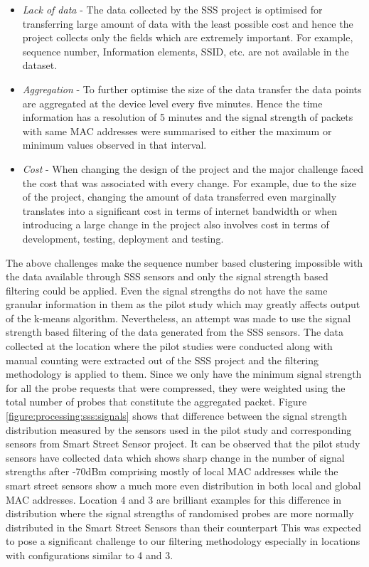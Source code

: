 \begin{itemize}
  \item \textit{Lack of data} - The data collected by the SSS project is optimised for transferring large amount of data with the least possible cost and hence the project collects only the fields which are extremely important. For example, sequence number, Information elements, SSID, etc. are not available in the dataset.
  \item \textit{Aggregation} - To further optimise the size of the data transfer the data points are aggregated at the device level every five minutes. Hence the time information has a resolution of 5 minutes and the signal strength of packets with same MAC addresses were summarised to either the maximum or minimum values observed in that interval.
  \item \textit{Cost} - When changing the design of the project and the major challenge faced the cost that was associated with every change. For example, due to the size of the project, changing the amount of data transferred even marginally translates into a significant cost in terms of internet bandwidth or when introducing a large change in the project also involves cost in terms of development, testing, deployment and testing.
\end{itemize}

The above challenges make the sequence number based clustering impossible with the data available through SSS sensors and only the signal strength based filtering could be applied. 
Even the signal strengths do not have the same granular information in them as the pilot study which may greatly affects output of the k-means algorithm.
Nevertheless, an attempt was made to use the signal strength based filtering of the data generated from the SSS sensors.
The data collected at the location where the pilot studies were conducted along with manual counting were extracted out of the SSS project and the filtering methodology is applied to them.
Since we only have the minimum signal strength for all the probe requests that were compressed, they were weighted using the total number of probes that constitute the aggregated packet.
Figure \ref{figure:processing:sss:signals} shows that difference between the signal strength distribution measured by the sensors used in the pilot study and corresponding sensors from Smart Street Sensor project.
It can be observed that the pilot study sensors have collected data which shows sharp change in the number of signal strengths after -70dBm comprising mostly of local MAC addresses while the smart street sensors show a much more even distribution in both local and global MAC addresses.
Location 4 and 3 are brilliant examples for this difference in distribution where the signal strengths of randomised probes are more normally distributed in the Smart Street Sensors than their counterpart
This was expected to pose a significant challenge to our filtering methodology especially in locations with configurations similar to 4 and 3.


